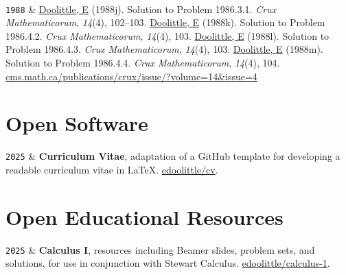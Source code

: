 \documentclass[9pt,a4paper]{article}
\newcommand{\LastName}{Doolittle}
\newcommand{\Initials}{E}
\newcommand{\Me}{\underline{\LastName, \Initials}}  %
\newcommand{\Year}[1]{\fontsize{10pt}{0}\selectfont \texttt{#1}}
\newcommand{\Website}[1]{\href{https://#1}{#1}}
\newcommand{\GitHub}[1]{\faGithub{} \href{https://github.com/#1}{#1}}
\begin{document}
\begin{EntriesTableYear}
  \\
  \Year{1988} & \Me{} (1988j).  Solution to Problem 1986.3.1.  \textit{Crux
  Mathematicorum}, \textit{14}(4), 102--103.  %
  \newline %
  \Me{} (1988k).  Solution to Problem 1986.4.2.  \textit{Crux Mathematicorum},
  \textit{14}(4), 103.  %
  \newline %
  \Me{} (1988l).  Solution to Problem 1986.4.3.  \textit{Crux Mathematicorum},
  \textit{14}(4), 103.  %
  \newline %
  \Me{} (1988m).  Solution to Problem 1986.4.4.  \textit{Crux Mathematicorum},
  \textit{14}(4), 104.  %
  \newline %
  \Website{cms.math.ca/publications/crux/issue/?volume=14\&issue=4}
\end{EntriesTableYear}
      
\section{Open Software}

\begin{EntriesTableYear}
  \Year{2025} & \textbf{Curriculum Vitae}, adaptation of a GitHub
  template for developing a readable curriculum vitae in \LaTeX.
  \GitHub{edoolittle/cv}.
\end{EntriesTableYear}

\section{Open Educational Resources}

\begin{EntriesTableYear}
  \Year{2025} & \textbf{Calculus I}, resources including Beamer
  slides, problem sets, and solutions, for use in conjunction with
  Stewart Calculus.  \GitHub{edoolittle/calculus-1}.
\end{EntriesTableYear}

\end{document}
